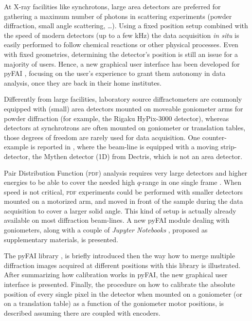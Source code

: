 \documentclass[preprint, pdf]{iucr}              %
\begin{document}
At X-ray facilities like synchrotons, large area detectors are 
preferred for gathering a maximum number of photons in
scattering experiments (powder diffraction, small angle
scattering, \ldots).
Using a fixed position setup combined with the speed of modern detectors (up
to a few kHz) the data acquisition \textit{in situ} is easily
performed to follow chemical reactions or other physical processes.
Even with fixed geometries, determining the detector's position is
still an issue for a majority of users. 
Hence, a new graphical user interface has been developed for pyFAI
\cite{pyFAI_0.14.1}, focusing on the user's experience to grant them autonomy in
data analysis, once they are back in their home institutes.

Differently from large facilities, laboratory source diffractometers
are commonly equipped with (small) area detectors mounted on moveable goniometer
arms for powder diffraction (for example, the Rigaku HyPix-3000 detector),
whereas detectors at synchrotrons are often mounted on goniometer or
translation tables, those degrees of freedom are rarely used for data
acquisition.
One counter-example is reported in \cite{Gao:kc5032}, where the beam-line
is equipped with a moving strip-detector, the Mythen detector (1D) from Dectris,
which is not an area detector.




Pair Distribution Function (\textsc{pdf}) analysis requires very large
detectors and higher energies to be able to cover the needed high $q$-range in
one single frame \cite{Chupas:wf5000}.
When speed is not critical, \textsc{pdf} experiments could be performed
with smaller detectors mounted on a motorized arm, and moved in front of
the sample during the data acquisition to cover a larger solid angle. 
This kind of setup is actually already available on most diffraction
beam-lines. 
A new pyFAI module dealing with goniometers, along with
a couple of \textit{Jupyter Notebooks}
\cite{ipython}, proposed as supplementary materials, is presented.

The pyFAI library \cite{fv5028}, is briefly introduced then the way how to
merge multiple diffraction images acquired at different positions with this
library \cite{PyFAI_PDJ} is illustrated. 
After summarizing how calibration works in pyFAI, the new graphical user
interface is presented.
Finally, the procedure on how to calibrate the absolute position of
every single pixel in the detector when mounted on a goniometer (or on a
translation table) as a function of the goniometer motor positions, is
described assuming there are coupled with encoders. 
\end{document}
